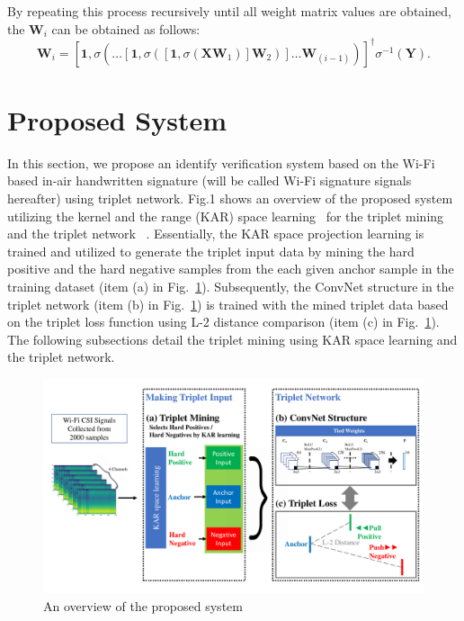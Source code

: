\documentclass[runningheads]{llncs}
\begin{document}
By repeating this process recursively until all weight matrix values are obtained, the $\mathbf{W}_{i}$ can be obtained as follows:
\begin{equation}
    \mathbf{W}_{i} = \left[\mathbf{1},\sigma\left(\dots\left[\mathbf{1},\sigma\left(\left[\mathbf{1},\sigma\left(\mathbf{X}\mathbf{W}_{1}\right)\right]\mathbf{W}_{2}\right)\right]\dots\mathbf{W}_{(i-1)}\right)\right]^{\dagger}\sigma^{-1}\left(\mathbf{Y}\right).
\end{equation}


\section{Proposed System}

In this section, we propose an identify verification system based on the Wi-Fi based in-air handwritten signature (will be called Wi-Fi signature signals hereafter) using triplet network. Fig.1 shows an overview of the proposed system utilizing the kernel and the range (KAR) space learning~\cite{toh2018learning,toh2018gradient} for the triplet mining and the triplet network ~\cite{schroff2015facenet}.
Essentially, the KAR space projection learning is trained and utilized to generate the triplet input data by mining the hard positive and the hard negative samples from the each given anchor sample in the training dataset (item (a) in Fig.~\ref{fig1}).
Subsequently, the ConvNet structure in the triplet network (item (b) in Fig.~\ref{fig1}) is trained with the mined triplet data based on the triplet loss function using L-2 distance comparison (item (c) in Fig.~\ref{fig1}).
The following subsections detail the triplet mining using KAR space learning and the triplet network.

\begin{figure}
    \includegraphics[width=\textwidth]{fig1_tcnn_kar_v3}
    \caption{An overview of the proposed system} \label{fig1}
\end{figure}
\end{document}
